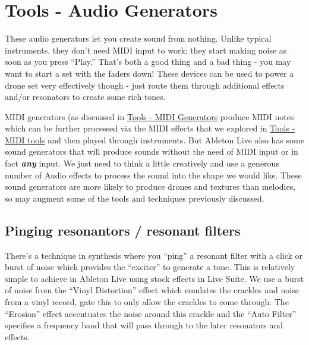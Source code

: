 \documentclass[
  12pt,
  letterpaper,
  oneside,
  open=any]{scrbook}
\begin{document}

\chapter{Tools - Audio
Generators}\label{Chapter-014-Tools-Audio_Generators}

These audio generators let you create sound from nothing. Unlike typical
instruments, they don't need MIDI input to work; they start making noise
as soon as you press ``Play.'' That's both a good thing and a bad thing
- you may want to start a set with the faders down! These devices can be
used to power a drone set very effectively though - just route them
through additional effects and/or resonators to create some rich tones.

\begin{tcolorbox}[enhanced jigsaw, breakable, left=2mm, leftrule=.75mm, toprule=.15mm, opacitybacktitle=0.6, toptitle=1mm, coltitle=black, colback=white, colbacktitle=quarto-callout-tip-color!10!white, opacityback=0, rightrule=.15mm, bottomrule=.15mm, titlerule=0mm, title=\textcolor{quarto-callout-tip-color}{\faLightbulb}\hspace{0.5em}{Key idea}, arc=.35mm, bottomtitle=1mm, colframe=quarto-callout-tip-color-frame]

MIDI generators (as discussed in
\hyperref[Chapter-012-Tools-MIDI_Generators]{Tools - MIDI Generators}
produce MIDI notes which can be further processed via the MIDI effects
that we explored in \hyperref[Chapter-004-Tools-MIDI_tools]{Tools - MIDI
tools} and then played through instruments. But Ableton Live also has
some sound generators that will produce sounds without the need of MIDI
input or in fact \textbf{\emph{any}} input. We just need to think a
little creatively and use a generous number of Audio effects to process
the sound into the shape we would like. These sound generators are more
likely to produce drones and textures than melodies, so may augment some
of the tools and techniques previously discussed.

\end{tcolorbox}

\section{Pinging resonantors / resonant
filters}\label{pinging-resonantors-resonant-filters}

There's a technique in synthesis where you ``ping'' a resonant filter
with a click or burst of noise which provides the ``exciter'' to
generate a tone. This is relatively simple to achieve in Ableton Live
using stock effects in Live Suite. We use a burst of noise from the
``Vinyl Distortion'' effect which emulates the crackles and noise from a
vinyl record, gate this to only allow the crackles to come through. The
``Erosion'' effect accentuates the noise around this crackle and the
``Auto Filter'' specifies a frequency band that will pass through to the
later resonators and effects.
\end{document}
